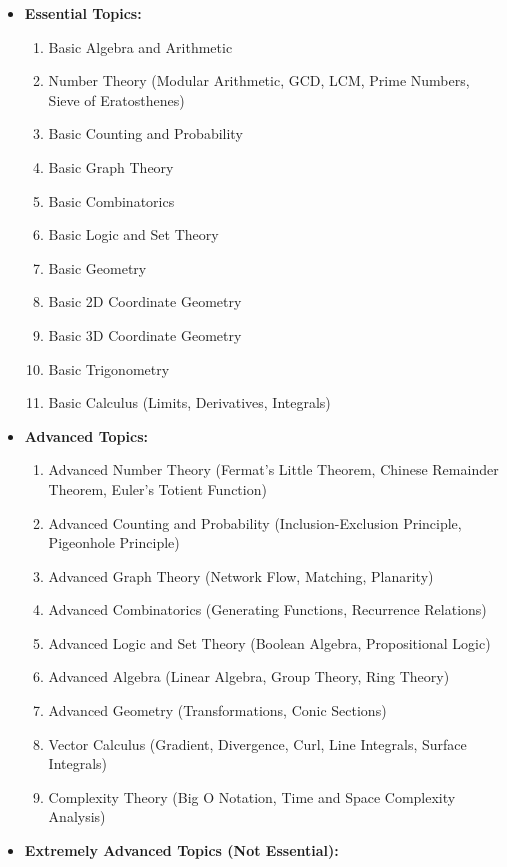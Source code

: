 \documentclass[openany]{book}
\begin{document}
\begin{itemize}
    \item \textbf{Essential Topics: }
\begin{enumerate}
    \item Basic Algebra and Arithmetic
    \item Number Theory (Modular Arithmetic, GCD, LCM, Prime Numbers, Sieve of Eratosthenes)
    \item Basic Counting and Probability
    \item Basic Graph Theory
    \item Basic Combinatorics
    \item Basic Logic and Set Theory
    \item Basic Geometry
    \item Basic 2D Coordinate Geometry
    \item Basic 3D Coordinate Geometry
    \item Basic Trigonometry
    \item Basic Calculus (Limits, Derivatives, Integrals)
\end{enumerate}
    \item \textbf{Advanced Topics: }
    \begin{enumerate}
        \item Advanced Number Theory (Fermat's Little Theorem, Chinese Remainder Theorem, Euler's Totient Function)
        \item Advanced Counting and Probability (Inclusion-Exclusion Principle, Pigeonhole Principle)
        \item Advanced Graph Theory (Network Flow, Matching, Planarity)
        \item Advanced Combinatorics (Generating Functions, Recurrence Relations)
        \item Advanced Logic and Set Theory (Boolean Algebra, Propositional Logic)
        \item Advanced Algebra (Linear Algebra, Group Theory, Ring Theory)
        \item Advanced Geometry (Transformations, Conic Sections)
        \item Vector Calculus (Gradient, Divergence, Curl, Line Integrals, Surface Integrals)
        \item Complexity Theory (Big O Notation, Time and Space Complexity Analysis)
    \end{enumerate}
    \item \textbf{Extremely Advanced Topics (Not Essential): }
    \begin{enumerate}

\end{enumerate}
\end{itemize}
\end{document}
